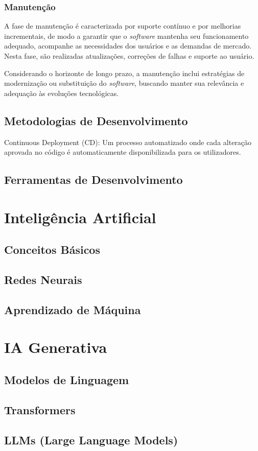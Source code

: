 \subsubsection{Manutenção}

A fase de manutenção é caracterizada por suporte contínuo e por melhorias incrementais, de modo a garantir que o \textit{software} mantenha seu funcionamento adequado, acompanhe as necessidades dos usuários e as demandas de mercado. Nesta fase, são realizadas atualizações, correções de falhas e suporte ao usuário.

Considerando o horizonte de longo prazo, a manutenção inclui estratégias de modernização ou substituição do \textit{software}, buscando manter sua relevância e adequação às evoluções tecnológicas.

\subsection{Metodologias de Desenvolvimento}

Continuous Deployment (CD):
Um processo automatizado onde cada alteração aprovada no código é automaticamente disponibilizada para os utilizadores.

\subsection{Ferramentas de Desenvolvimento}

\section{Inteligência Artificial}
\subsection{Conceitos Básicos}
\subsection{Redes Neurais}
\subsection{Aprendizado de Máquina}

\section{IA Generativa}
\subsection{Modelos de Linguagem}
\subsection{Transformers}
\subsection{LLMs (Large Language Models)}